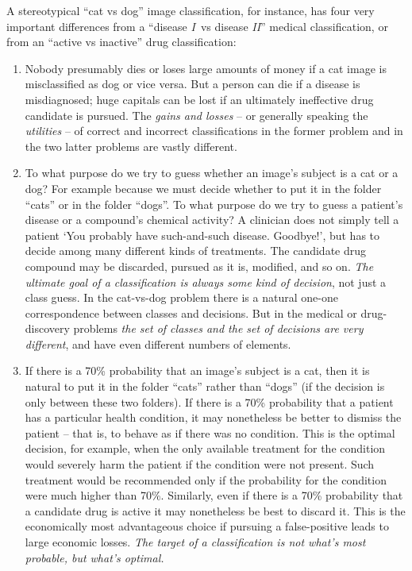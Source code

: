 \documentclass[\ifafour a4paper,12pt,\else a5paper,10pt,\fi%
onecolumn,oneside,article,%
british%
]{memoir}
\theoremstyle{remark}
\theoremstyle{innote}
\newcommand*{\pencil}{{\fontencoding{U}\fontfamily{fontawesometwo}\selectfont\symbol{210}}}
\newcommand{\mynotep}[1]{{\footnotesize\color{notecolour}\pencil\ #1}}
\renewcommand*{\|}[1][]{\nonscript\:#1\vert\nonscript\:\mathopen{}}
\newcommand*{\tI}{\textit{I}}
\newcommand*{\tII}{\textit{II}}
\begin{document}
A stereotypical \enquote{cat vs dog} image classification, for instance, has four very important differences from a \enquote{disease \tI\ vs disease \tII} medical classification, or from an \enquote{active vs inactive} drug classification:
\begin{enumerate}[label=(\roman*)]

\item\label{item:gain_loss}Nobody presumably dies or loses large amounts of money if a cat image is misclassified as dog or vice versa. But a person can die if a disease is misdiagnosed; huge capitals can be lost if an ultimately ineffective drug candidate is pursued. The \emph{gains and losses} -- or generally speaking the \emph{utilities} -- of correct and incorrect classifications in the former problem and in the two latter problems are vastly different.

\item\label{item:decisions_classes} To what purpose do we try to guess whether an image's subject is a cat or a dog? For example because we must decide whether to put it in the folder \enquote{cats} or in the folder \enquote{dogs}. To what purpose do we try to guess a patient's disease or a compound's chemical activity? A clinician does not simply tell a patient \enquote*{You probably have such-and-such disease. Goodbye!}, but has to decide among many different kinds of treatments. The candidate drug compound may be discarded, pursued as it is, modified, and so on. \emph{The ultimate goal of a classification is always some kind of decision}, not just a class guess. In the cat-vs-dog problem there is a natural one-one correspondence between classes and decisions. But in the medical or drug-discovery problems \emph{the set of classes and the set of decisions are very different}, and have even different numbers of elements.

\item\label{item:optimal_truth} If there is a 70\% probability that an image's subject is a cat, then it is natural to put it in the folder \enquote{cats} rather than \enquote{dogs} (if the decision is only between these two folders). If there is a 70\% probability that a patient has a particular health condition, it may nonetheless be better to dismiss the patient -- that is, to behave as if there was no condition. This is the optimal decision, for example, when the only available treatment for the condition would severely harm the patient if the condition were not present. Such treatment would be recommended only if the probability for the condition were much higher than 70\%. Similarly, even if there is a 70\% probability that a candidate drug is active it may nonetheless be best to discard it. This is the economically most advantageous choice if pursuing a false-positive leads to large economic losses. \emph{The target of a classification is not what’s most probable, but what’s optimal.}


\end{enumerate}
\end{document}
